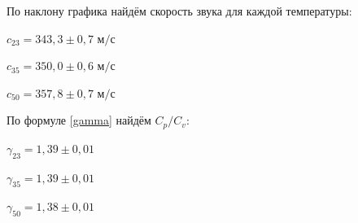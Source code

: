 \documentclass[a4paper,12pt]{article} %
\begin{document}
По наклону графика найдём скорость звука для каждой температуры:

\begin{center}
    $\displaystyle c_{23}=343,3 \pm 0,7$ м$/$с 
    \break
    
    $\displaystyle c_{35}=350,0 \pm 0,6$ м$/$с 
    \break
    
    $\displaystyle c_{50}=357,8 \pm 0,7$ м$/$с 
    \break
\end{center}

По формуле \ref{gamma} найдём $\displaystyle C_p/C_v$:

\begin{center}
    
    $\displaystyle \gamma_{23}=1,39 \pm 0,01$
    \break
    
    $\displaystyle \gamma_{35}=1,39 \pm 0,01$
    \break
    
    $\displaystyle \gamma_{50}=1,38 \pm 0,01$
    \break
\end{center}
\end{document}
